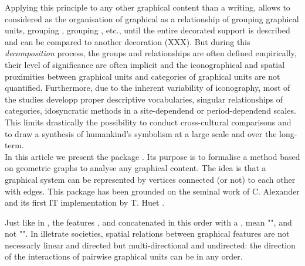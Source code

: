 \documentclass[article]{jss}
\begin{document}
Applying this principle to any other graphical content than a writing, allows to considered as the organisation of graphical as a relationship of  grouping graphical units,  grouping ,  grouping , etc., until the entire decorated support is described and can be compared to another decoration (XXX). But during this \emph{decomposition} process, the groups and relationships are often defined empirically, their level of significance are often implicit and the iconographical and spatial proximities between graphical units and categories of graphical units are not quantified. Furthermore, due to the inherent variability of iconography, most of the studies developp proper descriptive vocabularies, singular relationships of categories, idosyncratic methods in a site-dependend or period-dependend scales. This limits drastically the possibility to conduct cross-cultural comparisons and to draw a synthesis of humankind's symbolism at a large scale and over the long-term. 
\\
In this article we present the  package . Its purpose is to formalise a method based on geometric graphs to analyse any graphical content. The idea is that a graphical system can be represented by vertices connected (or not) to each other with edges. This package has been grounded on the seminal work of C. Alexander \citep{Alexander08} and its first IT implementation by T. Huet \citep{Huet18a}. 

Just like in , the features ,  and  concatenated in this order with a , mean "", and not "". In illetrate societies, spatial relations between graphical features are not necessarly linear and directed but multi-directional and undirected: the direction of the interactions of pairwise graphical units can be in any order.  
\end{document}
